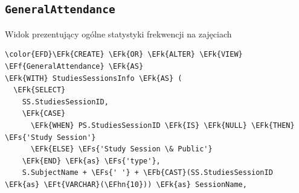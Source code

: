 \documentclass[11pt]{article}
\newcommand{\EFs}[1]{\textcolor{EFs}{#1}} %
\newcommand{\EFk}[1]{\textcolor{EFk}{\textbf{#1}}} %
\newcommand{\EFb}[1]{\textcolor{EFb}{\textbf{#1}}} %
\newcommand{\EFf}[1]{\textcolor{EFf}{#1}} %
\newcommand{\EFt}[1]{\textcolor{EFt}{\textbf{#1}}} %
\newcommand{\EFhn}[1]{\textcolor{EFhn}{#1}} %
\begin{document}
\subsection{\texttt{GeneralAttendance}}
\label{sec:orgcd066dc}
Widok prezentujący ogólne statystyki frekwencji na zajęciach
\begin{Code}
\begin{Verbatim}
\color{EFD}\EFk{CREATE} \EFk{OR} \EFk{ALTER} \EFk{VIEW} \EFf{GeneralAttendance} \EFk{AS}
\EFk{WITH} StudiesSessionsInfo \EFk{AS} (
  \EFk{SELECT} 
    SS.StudiesSessionID, 
    \EFk{CASE}
      \EFk{WHEN} PS.StudiesSessionID \EFk{IS} \EFk{NULL} \EFk{THEN} \EFs{'Study Session'}
      \EFk{ELSE} \EFs{'Study Session \& Public'}
    \EFk{END} \EFk{as} \EFs{'type'},
    S.SubjectName + \EFs{' '} + \EFb{CAST}(SS.StudiesSessionID \EFk{as} \EFt{VARCHAR}(\EFhn{10})) \EFk{as} SessionName,


\end{Verbatim}
\end{Code}
\end{document}
